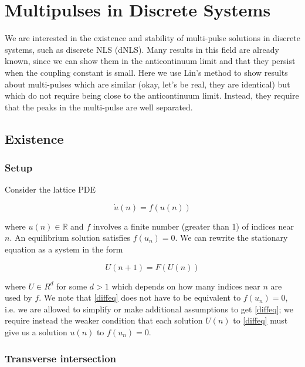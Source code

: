 \documentclass[12pt]{article}
\def\R{{\mathbb R}}
\begin{document}
\section{Multipulses in Discrete Systems}

We are interested in the existence and stability of multi-pulse solutions in  discrete systems, such as discrete NLS (dNLS). Many results in this field are already known, since we can show them in the anticontinuum limit and that they persist when the coupling constant is small. Here we use Lin's method to show results about multi-pulses which are similar (okay, let's be real, they are identical) but which do not require being close to the anticontinuum limit. Instead, they require that the peaks in the multi-pulse are well separated.

\subsection{Existence}

\subsubsection{Setup}

Consider the lattice PDE

\begin{equation}\label{latticePDE}
\dot{u}(n) = f(u(n))
\end{equation}

where $u(n) \in \R$ and $f$ involves a finite number (greater than 1) of indices near $n$. An equilibrium solution satisfies $f(u_n) = 0$. We can rewrite the stationary equation as a system in the form 

\begin{equation}\label{diffeq}
U(n+1) = F(U(n))
\end{equation}

where $U \in R^d$ for some $d > 1$ which depends on how many indices near $n$ are used by $f$. We note that \eqref{diffeq} does not have to be equivalent to $f(u_n) = 0$, i.e. we are allowed to simplify or make additional assumptions to get \eqref{diffeq}; we require instead the weaker condition that each solution $U(n)$ to \eqref{diffeq} must give us a solution $u(n)$ to $f(u_n) = 0$.

\subsubsection{Transverse intersection}
\end{document}
